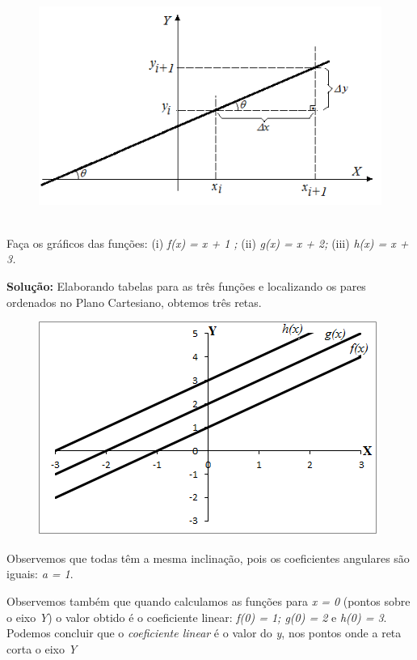 \begin{figure}[H]
	\begin{Center}
		\includegraphics[width=5.09in,height=2.95in]{capitulos/funcao_do_primeiro_grau/media/image10.png}
	\end{Center}
\end{figure}

\begin{texemplo}
Faça os gráficos das funções: (i)  \textit{ f(x) = x + 1  ;  }(ii) \textit{ g(x) = x + 2; }(iii) \textit{h(x) = x + 3.}

\textbf{Solução:} Elaborando tabelas para as três funções e localizando os pares ordenados no Plano Cartesiano, obtemos três retas.

\begin{figure}[H]
	\begin{Center}
		\includegraphics[width=4.39in,height=2.75in]{capitulos/funcao_do_primeiro_grau/media/image11.png}
	\end{Center}
\end{figure}

Observemos que todas têm a mesma inclinação, pois os coeficientes angulares são iguais: \textit{a = 1}.

Observemos também que quando calculamos as funções para \textit{x = 0} (pontos sobre o eixo \textit{Y}) o valor obtido é o coeficiente linear: \textit{f(0) = 1; g(0) = 2  }e\textit{  h(0) = 3}.  Podemos concluir que o \textit{coeficiente linear} é o valor do \textit{y}, nos pontos onde a reta corta o eixo \textit{Y}  \qedsymbol{}
\end{texemplo}

